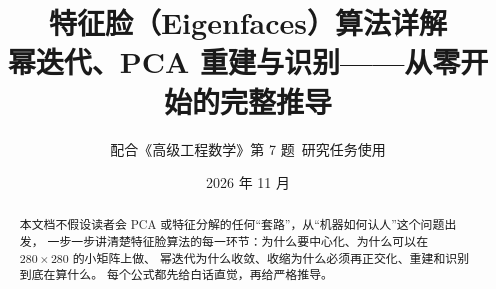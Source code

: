 \documentclass[12pt]{ctexart}
\title{\textbf{特征脸（Eigenfaces）算法详解}\\[4pt]
\large 幂迭代、PCA 重建与识别——从零开始的完整推导}
\author{配合《高级工程数学》第 7 题\ 研究任务使用}
\date{2026 年 11 月}
\begin{document}
\maketitle

\begin{abstract}
本文档不假设读者会 PCA 或特征分解的任何“套路”，从“机器如何认人”这个问题出发，
一步一步讲清楚特征脸算法的每一环节：为什么要中心化、为什么可以在 $280\times 280$ 的小矩阵上做、
幂迭代为什么收敛、收缩为什么必须再正交化、重建和识别到底在算什么。
每个公式都先给白话直觉，再给严格推导。
\end{abstract}

\tableofcontents
\bigskip

















\end{document}
